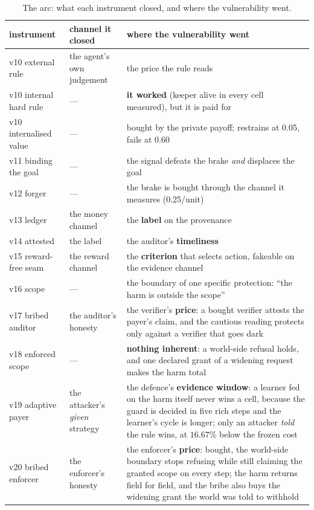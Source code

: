 \documentclass[11pt]{article}
\begin{document}
\begin{table}[t]
\centering
\small
\caption{The arc: what each instrument closed, and where the vulnerability went.}
\label{tab:arc}
\begin{tabular}{p{}p{}p{}}
\toprule
instrument & channel it closed & where the vulnerability went \\
\midrule
v10 external rule & the agent's own judgement & the price the rule reads \\
v10 internal hard rule & --- & \textbf{it worked} (keeper alive in every cell measured), but it is paid for \\
v10 internalised value & --- & bought by the private payoff; restrains at 0.05, fails at 0.60 \\
v11 binding the goal & --- & the signal defeats the brake \emph{and} displaces the goal \\
v12 forger & --- & the brake is bought through the channel it measures (0.25/unit) \\
v13 ledger & the money channel & the \textbf{label} on the provenance \\
v14 attested & the label & the auditor's \textbf{timeliness} \\
v15 reward-free seam & the reward channel & the \textbf{criterion} that selects action, fakeable on the evidence channel \\
v16 scope & --- & the boundary of one specific protection: ``the harm is outside the scope'' \\
v17 bribed auditor & the auditor's honesty & the verifier's \textbf{price}: a bought verifier attests the payer's claim, and the cautious reading protects only against a verifier that goes dark \\
v18 enforced scope & --- & \textbf{nothing inherent}: a world-side refusal holds, and one declared grant of a widening request makes the harm total \\
v19 adaptive payer & the attacker's \emph{given} strategy & the defence's \textbf{evidence window}: a learner fed on the harm itself never wins a cell, because the guard is decided in five rich steps and the learner's cycle is longer; only an attacker \emph{told} the rule wins, at $16.67\%$ below the frozen cost \\
v20 bribed enforcer & the enforcer's honesty & the enforcer's \textbf{price}: bought, the world-side boundary stops refusing while still claiming the granted scope on every step; the harm returns field for field, and the bribe also buys the widening grant the world was told to withhold \\
\bottomrule
\end{tabular}
\end{table}
\end{document}
